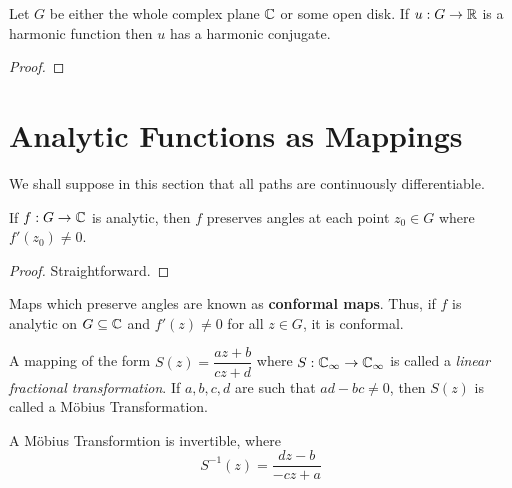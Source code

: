 \begin{theorem}
    Let $G$ be either the whole complex plane $\mathbb{C}$ or some open disk. If $u: G\to\mathbb{R}$ is a harmonic function then $u$ has a harmonic conjugate.
\end{theorem}
\begin{proof}
    
\end{proof}

\section{Analytic Functions as Mappings}

We shall suppose in this section that all paths are continuously differentiable.

\begin{theorem}
    If $f: G\to\mathbb{C}$ is analytic, then $f$ preserves angles at each point $z_0\in G$ where $f'(z_0)\ne 0$.
\end{theorem}
\begin{proof}
    Straightforward.
\end{proof}

Maps which preserve angles are known as \textbf{conformal maps}. Thus, if $f$ is analytic on $G\subseteq\mathbb{C}$ and $f'(z)\ne 0$ for all $z\in G$, it is conformal.

\begin{definition}
    A mapping of the form $S(z) = \dfrac{az + b}{cz + d}$ where $S:\mathbb{C}_\infty\to\mathbb{C}_\infty$ is called a \textit{linear fractional transformation}. If $a,b,c,d$ are such that $ad - bc\ne 0$, then $S(z)$ is called a M\"obius Transformation.
\end{definition}

A M\"obius Transformtion is invertible, where 
\begin{equation*}
    S^{-1}(z) = \frac{dz - b}{-cz + a}
\end{equation*}